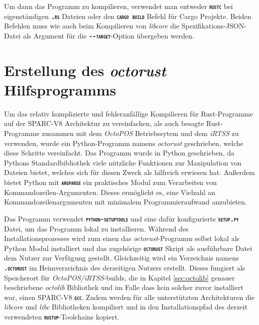 Um dann das Programm zu kompilieren, verwendet man entweder \texttt{\textsc{\textbf{rustc}}} bei eigenständigen
\texttt{\textsc{\textbf{.rs}}} Dateien oder den \texttt{\textsc{\textbf{cargo build}}} Befehl für Cargo Projekte. Beiden Befehlen muss wie auch beim Kompilieren von \textit{libcore} die 
Spezifikations-JSON-Datei als Argument für die \texttt{\textsc{\textbf{-{}-target}}}-Option übergeben werden. 

\section{Erstellung des \textit{octorust} Hilfsprogramms}

Um das relativ komplizierte und fehleranfällige Kompilieren für Rust-Programme
auf der SPARC-V8 Architektur zu vereinfachen, als
auch besagte Rust-Programme zusammen mit dem \textit{OctoPOS} Betriebssytem und dem \textit{iRTSS} zu verwenden,
wurde ein Python-Programm namens \textit{octorust} geschrieben, welche diese Schritte
vereinfacht.
Das Programm wurde in Python geschrieben, da Pythons Standardbibliothek viele nützliche Funktionen zur Manipulation
von Dateien bietet, welches sich für diesen Zweck als hilfreich erwiesen hat. Außerdem bietet Python mit 
\texttt{\textsc{\textbf{argparse}}} ein praktisches Modul zum Verarbeiten von Kommandozeilen-Argumenten.
Dieses ermöglicht es, eine Vielzahl an Kommandozeilenargumenten mit minimalem Programmieraufwand anzubieten.

Das Programm verwendet \texttt{\textsc{\textbf{python-setuptools}}} und eine dafür konfigurierte 
\texttt{\textsc{\textbf{setup.py}}} Datei, um das Programm lokal zu installieren.
Während des Installationsprozesses wird zum einen das \textit{octorust}-Programm selbst lokal als Python Modul 
installiert und das zugehörige \texttt{\textsc{\textbf{octorust}}} Skript als ausführbare Datei dem Nutzer zur 
Verfügung gestellt.
Gleichzeitig wird ein Verzeichnis namens \texttt{\textsc{\textbf{.octorust}}}
im Heimverzeichnis des derzeitigen Nutzers erstellt.
Dieses fungiert als Speicherort für \textit{OctoPOS/iRTSS}-builds, die in Kapitel \ref{sec:octolib} genauer
beschriebene \textit{octolib} Bibliothek und im Falle dass kein solcher zuvor installiert war, einen SPARC-V8
\texttt{\textsc{\textbf{gcc}}}.
Zudem werden für alle unterstützten Architekturen die \textit{libcore} und \textit{libc} Bibliotheken
kompiliert und in den Installationspfad des derzeit verwendeten \texttt{\textsc{\textbf{rustup}}}-Toolchains kopiert.

